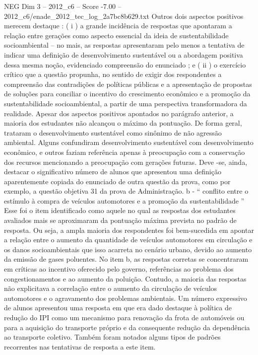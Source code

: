 \begin{textsample}{NEG Dim 3 – 2012\_c6 – Score -7.00 – 2012\_c6/enade\_2012\_tec\_log\_2a7bc8b629.txt}
Outros dois aspectos positivos merecem destaque : ( i ) a grande incidência de respostas que apontaram a relação entre gerações como aspecto essencial da ideia de sustentabilidade socioambiental – no mais, as respostas apresentaram pelo menos a tentativa de indicar uma definição de desenvolvimento sustentável ou a abordagem positiva dessa mesma noção, evidenciado compreensão do enunciado ; e ( ii ) o exercício crítico que a questão propunha, no sentido de exigir dos respondentes a compreensão das contradições de políticas públicas e a apresentação de propostas de soluções para conciliar o incentivo do crescimento econômico e a promoção da sustentabilidade socioambiental, a partir de uma perspectiva transformadora da realidade.
Apesar dos aspectos positivos apontados no parágrafo anterior, a maioria dos estudantes não alcançou o máximo da pontuação.
De forma geral, trataram o desenvolvimento sustentável como sinônimo de não agressão ambiental.
Alguns confundiram desenvolvimento sustentável com desenvolvimento econômico, e outros faziam referência apenas à preocupação com a conservação dos recursos mencionando a preocupação com gerações futuras.
Deve -se, ainda, destacar o significativo número de alunos que apresentou uma definição aparentemente copiada do enunciado de outra questão da prova, como por exemplo, a questão objetiva 31 da prova de Administração. b - “ conflito entre o estímulo à compra de veículos automotores e a promoção da sustentabilidade ” Esse foi o item identificado como aquele no qual as respostas dos estudantes avaliados mais se aproximaram da pontuação máxima prevista no padrão de resposta.
Ou seja, a ampla maioria dos respondentes foi bem-sucedida em apontar a relação entre o aumento da quantidade de veículos automotores em circulação e os danos socioambientais que isso acarreta no cenário urbano, devido ao aumento da emissão de gases poluentes.
No item b, as respostas corretas se concentraram em críticas ao incentivo oferecido pelo governo, referências ao problema dos congestionamentos e ao aumento da poluição.
Contudo, a maioria das respostas não explicitava a correlação entre o aumento da circulação de veículos automotores e o agravamento dos problemas ambientais.
Um número expressivo de alunos apresentou uma resposta em que era dado destaque à política de redução do IPI como um mecanismo para renovação da frota de automóveis ou para a aquisição do transporte próprio e da consequente redução da dependência ao transporte coletivo.
Também foram notados alguns tipos de padrões recorrentes nas tentativas de resposta a este item.

\end{textsample}
